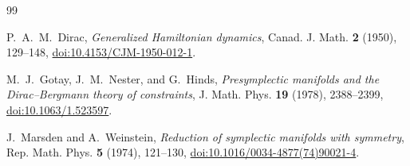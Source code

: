 \documentclass[11pt,letterpaper]{article}
\begin{document}
\begin{thebibliography}{99}

P.~A.~M.~Dirac,
\emph{Generalized Hamiltonian dynamics},
Canad. J. Math. \textbf{2} (1950), 129--148,
\href{https://doi.org/10.4153/CJM-1950-012-1}%
{doi:10.4153/CJM-1950-012-1}.

M.~J.~Gotay, J.~M.~Nester, and G.~Hinds,
\emph{Presymplectic manifolds and the Dirac--Bergmann theory of constraints},
J. Math. Phys. \textbf{19} (1978), 2388--2399,
\href{https://doi.org/10.1063/1.523597}{doi:10.1063/1.523597}.

J.~Marsden and A.~Weinstein,
\emph{Reduction of symplectic manifolds with symmetry},
Rep. Math. Phys. \textbf{5} (1974), 121--130,
\href{https://doi.org/10.1016/0034-4877(74)90021-4}%
{doi:10.1016/0034-4877(74)90021-4}.

\end{thebibliography}
\end{document}
